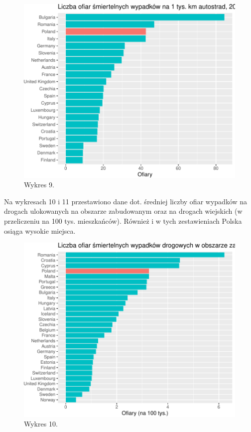 \documentclass[
]{article}
\begin{document}
\begin{figure}

\includegraphics{raport_wypadki_files/figure-latex/unnamed-chunk-17-1} \hfill{}

\caption{Wykres 9.}\label{fig:unnamed-chunk-17}
\end{figure}

Na wykresach 10 i 11 przestawiono dane dot. średniej liczby ofiar
wypadków na drogach ulokowanych na obszarze zabudowanym oraz na drogach
wiejskich (w przeliczeniu na 100 tys. mieszkańców). Również i w tych
zestawieniach Polska osiąga wysokie miejsca.

\begin{figure}

\includegraphics{raport_wypadki_files/figure-latex/unnamed-chunk-18-1} \hfill{}

\caption{Wykres 10.}\label{fig:unnamed-chunk-18}
\end{figure}
\end{document}
